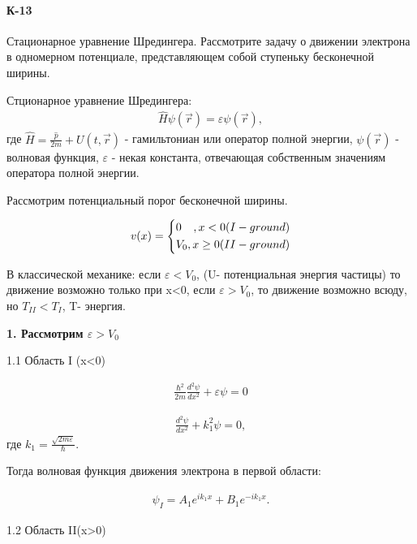 \documentclass[__main__.tex]{subfiles}
\begin{document}
\paragraph{К-13}
Стационарное уравнение Шредингера. Рассмотрите задачу о движении электрона в одномерном потенциале, представляющем собой ступеньку бесконечной ширины.

\begin{definition}
	Стционарное уравнение Шредингера: 
	\begin{gather}
	\label{shred}
	\hat{H}\psi(\vec{r})=\varepsilon\psi(\vec{r}), 
	\end{gather}
	где $\hat{H}=\frac{\hat{p}}{2m}+U(t,\vec{r})$ - гамильтониан или оператор полной энергии, $\psi(\vec{r})$ - волновая функция, $\varepsilon$ - некая константа,  отвечающая собственным значениям оператора полной энергии.
\end{definition}

Рассмотрим потенциальный порог бесконечной ширины.


$$
v(x)=
\left\{
\begin{gathered}
0\hfill ,x<0 (I - ground)\\
V_{0}\hfill, x\ge 0 (II - ground)\\
\end{gathered}
\right.
$$

В классической механике: если $\varepsilon<V_{0}$, (U- потенциальная энергия частицы) то движение возможно только при x<0, если $\varepsilon>V_{0}$, то движение возможно всюду, но $T_{II}<T_{I}$, T- энергия.

\textbf{1. Рассмотрим  $\varepsilon>V_{0}$ }

1.1 Область I (x<0)

\begin{gather}
\label{movi1}
\frac{\hbar^{2}}{2m}\frac{d^{2}\psi}{dx^{2}}+\varepsilon\psi=0
\end{gather}

\begin{gather}
\label{movi2}
\frac{d^{2}\psi}{dx^{2}}+k_{1}^{2}\psi=0,
\end{gather}
где $k_{1}=\frac{\sqrt{2m\varepsilon}}{\hbar}$.

Тогда волновая функция движения электрона в первой области:

\begin{gather}
\label{movi3}
\psi_{I}=A_{1}e^{ik_{1}x}+B_{1}e^{-ik_{1}x}.
\end{gather}

1.2 Область II(x>0)
\end{document}
